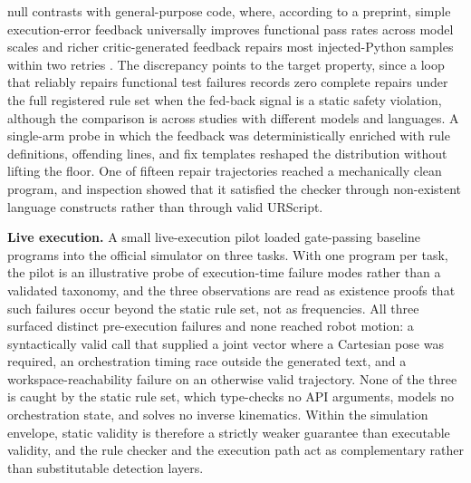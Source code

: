 \documentclass{ieeeaccess}
\begin{document}
null contrasts with general-purpose code, where, according to a preprint, simple
execution-error feedback universally improves functional pass rates across model scales
\cite{ref47} and richer
critic-generated feedback repairs most injected-Python samples within two retries
\cite{ref56}. The discrepancy points to the target property, since a loop that
reliably repairs functional test failures records zero complete repairs under the full registered rule set when the fed-back
signal is a static safety violation, although the comparison is across studies with different
models and languages. A single-arm probe in which the feedback was
deterministically enriched with rule definitions, offending lines, and fix templates
reshaped the distribution without lifting the floor. One of fifteen repair trajectories reached a
mechanically clean program, and inspection showed that it satisfied the checker through
non-existent language constructs rather than through valid URScript.

\textbf{Live execution.} A small live-execution pilot loaded gate-passing baseline
programs into the official simulator on three tasks. With one program per task, the pilot
is an illustrative probe of execution-time failure modes rather than a validated
taxonomy, and the three observations are read as existence proofs that such failures occur
beyond the static rule set, not as frequencies. All three surfaced distinct
pre-execution failures and none reached robot motion: a syntactically valid call that
supplied a joint vector where a Cartesian pose was required, an orchestration timing
race outside the generated text, and a workspace-reachability failure on an otherwise
valid trajectory. None of the three is caught by the static rule set, which
type-checks no API arguments, models no orchestration state, and solves no inverse
kinematics. Within the simulation envelope, static validity is therefore a strictly
weaker guarantee than executable validity, and the rule checker and the execution
path act as complementary rather than substitutable detection layers.
\end{document}
